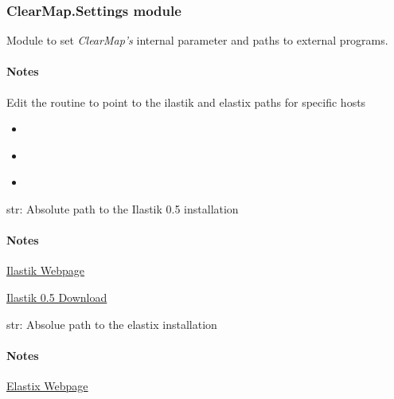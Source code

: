 \documentclass[letterpaper,10pt,english]{sphinxmanual}
\begin{document}
\subsubsection{ClearMap.Settings module}
\label{api/ClearMap.Settings:clearmap-settings-module}\label{api/ClearMap.Settings::doc}\label{api/ClearMap.Settings:module-ClearMap.Settings}
Module to set \emph{ClearMap's} internal parameter and paths to external programs.
\paragraph{Notes}

Edit the {\hyperref[api/ClearMap.Settings:ClearMap.Settings.setup]{\emph{}}} routine to point to the ilastik and elastix paths
for specific hosts



\begin{itemize}
\item {} 
{\hyperref[api/ClearMap.Settings:ClearMap.Settings.IlastikPath]{\emph{}}}

\item {} 
{\hyperref[api/ClearMap.Settings:ClearMap.Settings.ElastixPath]{\emph{}}}

\item {} 
{\hyperref[api/ClearMap.Parameter:module-ClearMap.Parameter]{\emph{}}}

\end{itemize}



\begin{fulllineitems}
\label{api/ClearMap.Settings:ClearMap.Settings.IlastikPath}
str: Absolute path to the Ilastik 0.5 installation
\paragraph{Notes}

\href{http://ilastik.org/}{Ilastik Webpage}

\href{http://old.ilastik.org/}{Ilastik 0.5 Download}

\end{fulllineitems}


\begin{fulllineitems}
\label{api/ClearMap.Settings:ClearMap.Settings.ElastixPath}
str: Absolue path to the elastix installation
\paragraph{Notes}

\href{http://elastix.isi.uu.nl/}{Elastix Webpage}

\end{fulllineitems}
\end{document}
